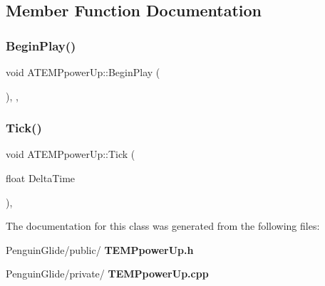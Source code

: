 \subsection{Member Function Documentation}
\mbox{\label{class_a_t_e_m_ppower_up_ab9508c8889af399731afc57e155e8c4d}} 
\subsubsection{BeginPlay()}
{\footnotesize\ttfamily void A\+T\+E\+M\+Ppower\+Up\+::\+Begin\+Play (\begin{DoxyParamCaption}{ }\end{DoxyParamCaption})\hspace{0.3cm}{\ttfamily [override]}, {\ttfamily [protected]}, {\ttfamily [virtual]}}

\mbox{\label{class_a_t_e_m_ppower_up_ab18d4bf91dbd7ea997b78504cf878db1}} 
\subsubsection{Tick()}
{\footnotesize\ttfamily void A\+T\+E\+M\+Ppower\+Up\+::\+Tick (\begin{DoxyParamCaption}\item[{float}]{Delta\+Time }\end{DoxyParamCaption})\hspace{0.3cm}{\ttfamily [override]}, {\ttfamily [virtual]}}



The documentation for this class was generated from the following files\+:\begin{DoxyCompactItemize}
\item 
Penguin\+Glide/public/\textbf{ T\+E\+M\+Ppower\+Up.\+h}\item 
Penguin\+Glide/private/\textbf{ T\+E\+M\+Ppower\+Up.\+cpp}\end{DoxyCompactItemize}
